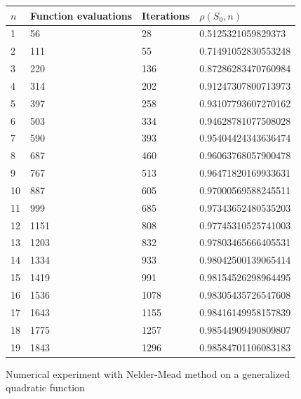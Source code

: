 \begin{figure}[htbp]
\begin{center}
\begin{tiny}
\begin{tabular}{|l|l|l|l|}
\hline
$n$ & Function evaluations & Iterations & $\rho(S_0,n)$\\
\hline
1 & 56 & 28 & 0.5125321059829373\\
2 & 111 & 55 & 0.71491052830553248\\
3 & 220 & 136 & 0.87286283470760984\\
4 & 314 & 202 & 0.91247307800713973\\
5 & 397 & 258 & 0.93107793607270162\\
6 & 503 & 334 & 0.94628781077508028\\
7 & 590 & 393 & 0.95404424343636474\\
8 & 687 & 460 & 0.96063768057900478\\
9 & 767 & 513 & 0.96471820169933631\\
10 & 887 & 605 & 0.97000569588245511\\
11 & 999 & 685 & 0.97343652480535203\\
12 & 1151 & 808 & 0.97745310525741003\\
13 & 1203 & 832 & 0.97803465666405531\\
14 & 1334 & 933 & 0.98042500139065414\\
15 & 1419 & 991 & 0.98154526298964495\\
16 & 1536 & 1078 & 0.98305435726547608\\
17 & 1643 & 1155 & 0.98416149958157839\\
18 & 1775 & 1257 & 0.98544909490809807\\
19 & 1843 & 1296 & 0.98584701106083183\\
\hline
\end{tabular}
\end{tiny}
\end{center}
\caption{Numerical experiment with Nelder-Mead method on a generalized quadratic function}
\label{fig-nm-numexp3-dimension}
\end{figure}

